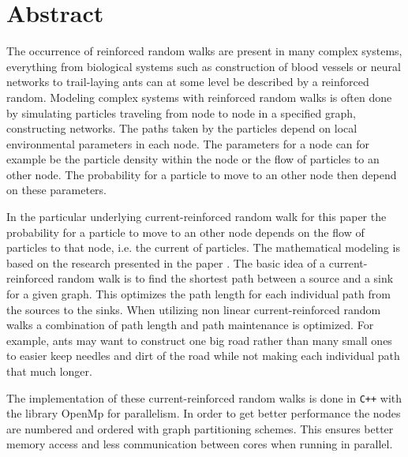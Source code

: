 \section{Abstract}
\label{sec:abstract}

The occurrence of reinforced random walks are present in many complex systems, everything from biological systems such as construction of blood vessels or neural networks to trail-laying ants can at some level be described by a reinforced random. Modeling complex systems with reinforced random walks is often done by simulating particles traveling from node to node in a specified graph, constructing networks. The paths taken by the particles depend on local environmental parameters in each node. The parameters for a node can for example be the particle density within the node or the flow of particles to an other node. The probability for a particle to move to an other node then depend on these parameters.

In the particular underlying current-reinforced random walk for this paper the probability for a particle to move to an other node depends on the flow of particles to that node, i.e. the current of particles. The mathematical modeling is based on the research presented in the paper \cite{Current}. The basic idea of a current-reinforced random walk is to find the shortest path between a source and a sink for a given graph. This optimizes the path length for each individual path from the sources to the sinks. When utilizing non linear current-reinforced random walks a combination of path length and path maintenance is optimized. For example, ants may want to construct one big road rather than many small ones to easier keep needles and dirt of the road while not making each individual path that much longer.


The implementation of these current-reinforced random walks is done in \texttt{C++} with the library OpenMp for parallelism. In order to get better performance the nodes are numbered and ordered with graph partitioning schemes. This ensures better memory access and less communication between cores when running in parallel. 